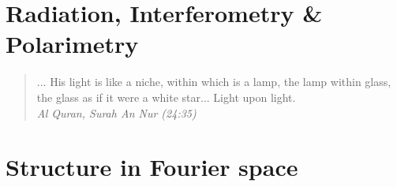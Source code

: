 \documentclass[12pt,twoside,openany]{book}
\newcommand{\halfspaced}{\renewcommand{\baselinestretch}{1.5}\normalfont}
\begin{document}
\newpage
{}
{}
\listoftables

\newpage
{}
\listoffigures


\halfspaced
\setlength{\parindent}{0.25in}



\mainmatter
\part{Radiation, Interferometry \& Polarimetry}

\vspace*{\fill} 
\begin{quote} 
\centering 
... His light is like a niche, within which is a lamp, the lamp within glass, the glass as if it were a white star... Light upon light.\\
\textit{Al Quran, Surah An Nur (24:35)}
\end{quote}
\vspace*{\fill}

%
%
%
%
%

%

%
%
\part{Structure in Fourier space}
\end{document}
